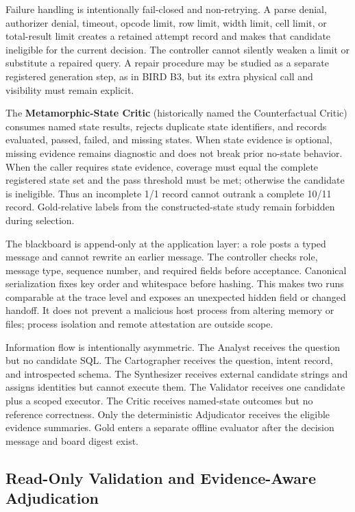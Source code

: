 \documentclass[applsci,article,submit,moreauthors]{Definitions/mdpi}
\begin{document}
Failure handling is intentionally fail-closed and non-retrying. A parse denial, authorizer denial, timeout, opcode limit, row limit, width limit, cell limit, or total-result limit creates a retained attempt record and makes that candidate ineligible for the current decision. The controller cannot silently weaken a limit or substitute a repaired query. A repair procedure may be studied as a separate registered generation step, as in BIRD B3, but its extra physical call and visibility must remain explicit.

The \textbf{Metamorphic-State Critic} (historically named the Counterfactual Critic) consumes named state results, rejects duplicate state identifiers, and records evaluated, passed, failed, and missing states. When state evidence is optional, missing evidence remains diagnostic and does not break prior no-state behavior. When the caller requires state evidence, coverage must equal the complete registered state set and the pass threshold must be met; otherwise the candidate is ineligible. Thus an incomplete 1/1 record cannot outrank a complete 10/11 record. Gold-relative labels from the constructed-state study remain forbidden during selection.

The blackboard is append-only at the application layer: a role posts a typed message and cannot rewrite an earlier message. The controller checks role, message type, sequence number, and required fields before acceptance. Canonical serialization fixes key order and whitespace before hashing. This makes two runs comparable at the trace level and exposes an unexpected hidden field or changed handoff. It does not prevent a malicious host process from altering memory or files; process isolation and remote attestation are outside scope.

Information flow is intentionally asymmetric. The Analyst receives the question but no candidate SQL. The Cartographer receives the question, intent record, and introspected schema. The Synthesizer receives external candidate strings and assigns identities but cannot execute them. The Validator receives one candidate plus a scoped executor. The Critic receives named-state outcomes but no reference correctness. Only the deterministic Adjudicator receives the eligible evidence summaries. Gold enters a separate offline evaluator after the decision message and board digest exist.

\subsection{Read-Only Validation and Evidence-Aware Adjudication}
\end{document}
